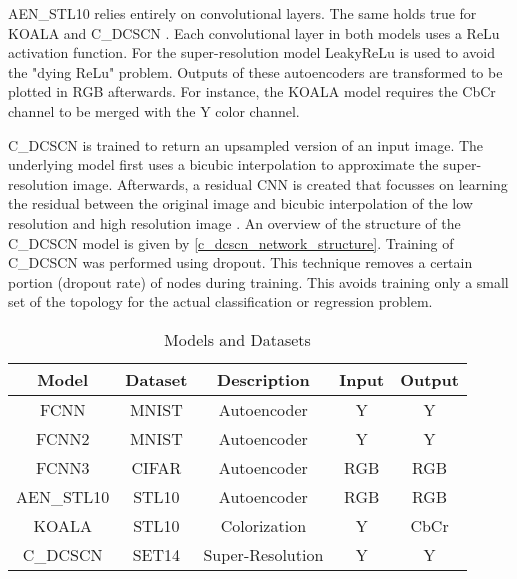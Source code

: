 AEN\_STL10 relies entirely on convolutional layers. The same holds true for KOALA \cite{KoalaModel} and C\_DCSCN
\cite{SuperModel}. Each convolutional layer in both models uses a ReLu activation function. For the super-resolution
model LeakyReLu is used to avoid the "dying ReLu" problem. Outputs of these
autoencoders are transformed to be plotted in RGB afterwards. For instance, the KOALA model requires the CbCr channel
to be merged with the Y color channel.

C\_DCSCN is trained to return an upsampled version of an input image. The underlying model first uses a bicubic interpolation
to approximate the super-resolution image. Afterwards, a residual CNN is created that focusses on learning the
residual between the original image and bicubic interpolation of the low resolution and high resolution
image \cite{SuperModel,SuperModel2}. An overview of the structure of the C\_DCSCN model is given by \autoref{c_dcscn_network_structure}.
Training of C\_DCSCN was performed using dropout. This technique removes a certain
portion (dropout rate) of nodes during training. This avoids training only a small set of the topology for the actual
classification or regression problem.
\endgroup


\begin{table}[]
\centering
\def\arraystretch{1.8}
\caption{Models and Datasets}
\label{ModelTable}
\begin{tabular}{|c|c|c|c|c|}
\hline
\textbf{Model} & \textbf{Dataset} & \textbf{Description} & \textbf{Input} & \textbf{Output} \\ \hline
FCNN           & MNIST            & Autoencoder          & Y              & Y               \\ \hline
FCNN2          & MNIST            & Autoencoder          & Y              & Y               \\ \hline
FCNN3          & CIFAR            & Autoencoder          & RGB            & RGB             \\ \hline
AEN\_STL10     & STL10            & Autoencoder          & RGB            & RGB             \\ \hline
KOALA          & STL10            & Colorization         & Y              & CbCr            \\ \hline
C\_DCSCN       & SET14            & Super-Resolution     & Y              & Y               \\ \hline
\end{tabular}
\end{table}


